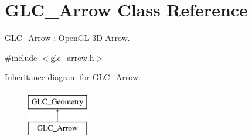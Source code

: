 \hypertarget{class_g_l_c___arrow}{\section{G\-L\-C\-\_\-\-Arrow Class Reference}
\label{class_g_l_c___arrow}
}


\hyperlink{class_g_l_c___arrow}{G\-L\-C\-\_\-\-Arrow} \-: Open\-G\-L 3\-D Arrow.  




{\ttfamily \#include $<$glc\-\_\-arrow.\-h$>$}

Inheritance diagram for G\-L\-C\-\_\-\-Arrow\-:\begin{figure}[H]
\begin{center}
\leavevmode
\includegraphics[height=2.000000cm]{class_g_l_c___arrow}
\end{center}
\end{figure}
